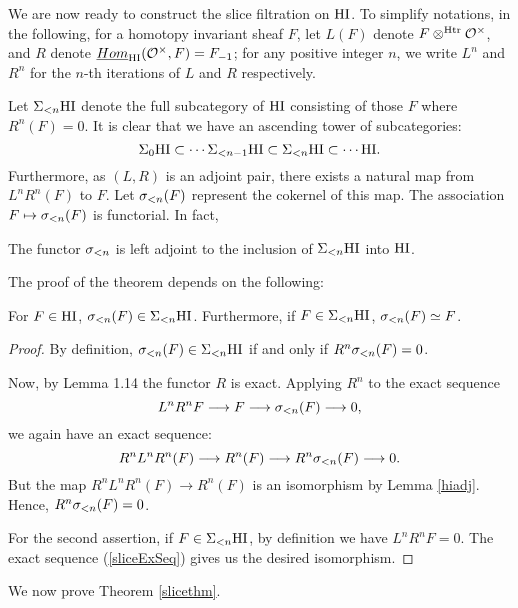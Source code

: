 We are now ready to construct the slice filtration on $\mathrm{HI}$. 
To simplify notations, in the following, for a homotopy invariant
sheaf $F$, let $L(F)$ denote $F \otimes^{\mathrm{Htr}} \mathcal{O}^{\times}$, and $R$ denote 
$\underline{Hom}_{\mathrm{HI}}(\mathcal{O}^{\times}, F) = F_{-1}$; for any positive integer $n$, we 
write $L^n$ and $R^n$ for the $n$-th iterations of $L$ and $R$ 
respectively.

Let $\Sigma_{< n} \mathrm{HI}$ denote the full subcategory of $\mathrm{HI}$ 
consisting of those $F$ where $R^n(F) = 0$. It is clear that we 
have an ascending tower of subcategories:
\[
\Sigma_{0} \mathrm{HI} \subset \cdots \Sigma_{< n - 1} \mathrm{HI} \subset 
\Sigma_{< n} \mathrm{HI} \subset \cdots \mathrm{HI}.
\]
Furthermore, as $(L, R)$ is an adjoint pair, there exists a 
natural map from $L^nR^n(F)$ to $F$. Let $\sigma_{< n}(F)$ represent 
the cokernel of this map. The association $F \mapsto 
\sigma_{< n}(F)$ is functorial. In fact,

\begin{thm}\label{slicethm}
The functor $\sigma_{< n}$ is left adjoint to the inclusion 
of $\Sigma_{< n} \mathrm{HI}$ into $\mathrm{HI}$.
\end{thm}

The proof of the theorem depends on the following:

\begin{lem}\label{hislice}
For $F \in \mathrm{HI}$, $\sigma_{< n}(F) \in \Sigma_{< n}\mathrm{HI}$. 
Furthermore, if $F \in \Sigma_{< n} \mathrm{HI}$, $\sigma_{<n}(F)
\simeq F$.
\end{lem}
\begin{proof}
By definition, $\sigma_{<n}(F) \in \Sigma_{< n}\mathrm{HI}$ if
and only if $R^n \sigma_{<n}(F) = 0$.

Now, by \cite{Deg10} Lemma 1.14 the functor $R$ is exact. Applying 
$R^n$ to the exact sequence
\begin{equation}\label{sliceExSeq}
L^nR^n F \longrightarrow F \longrightarrow \sigma_{< n}(F)
\longrightarrow 0,
\end{equation}
we again have an exact sequence:
\[
R^nL^nR^n (F) \longrightarrow R^n(F) \longrightarrow 
R^n\sigma_{< n}(F) \longrightarrow 0.
\]
But the map $R^nL^nR^n(F) \rightarrow R^n(F)$ is an isomorphism 
by Lemma \ref{hiadj}. Hence, $R^n\sigma_{< n}(F) = 0$.

For the second assertion, if $F \in \Sigma_{< n} \mathrm{HI}$,
by definition we have $L^nR^nF = 0$. The exact sequence 
(\ref{sliceExSeq}) gives us the desired isomorphism.
\end{proof}

We now prove Theorem \ref{slicethm}.

